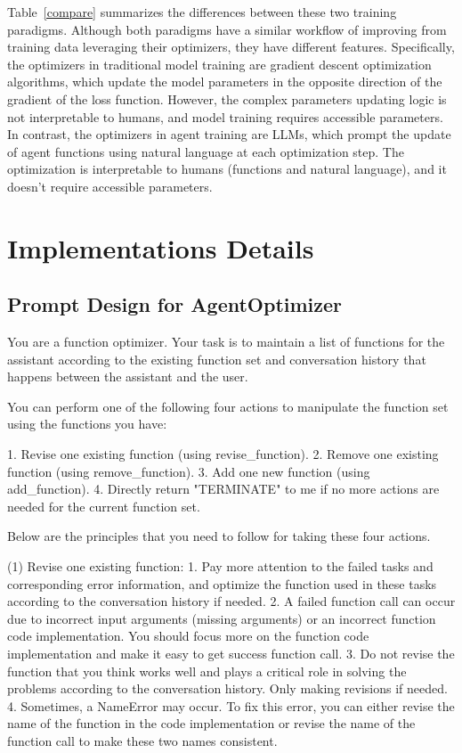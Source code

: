 \documentclass{article}
\theoremstyle{plain}
\theoremstyle{definition}
\theoremstyle{remark}
\begin{document}
Table~\ref{compare} summarizes the differences between these two training paradigms. Although both paradigms have a similar workflow of improving from training data leveraging their optimizers, they have different features. Specifically, the optimizers in traditional model training are gradient descent optimization algorithms, which update the model parameters in the opposite direction of the gradient of the loss function. However, the complex parameters updating logic is not interpretable to humans, and model training requires accessible parameters.
In contrast, the optimizers in agent training are LLMs, which prompt the update of agent functions using natural language at each optimization step. The optimization is interpretable to humans (functions and natural language), and it doesn’t require accessible parameters.

\section{Implementations Details}

\subsection{Prompt Design for AgentOptimizer}

You are a function optimizer. Your task is to maintain a list of functions for the assistant according to the existing function set and conversation history that happens between the assistant and the user. 

You can perform one of the following four actions to manipulate the function set using the functions you have: 

1. Revise one existing function (using revise\_function). 
2. Remove one existing function (using remove\_function).
3. Add one new function (using add\_function).
4. Directly return "TERMINATE" to me if no more actions are needed for the current function set.

Below are the principles that you need to follow for taking these four actions.

(1) Revise one existing function:
1. Pay more attention to the failed tasks and corresponding error information, and optimize the function used in these tasks according to the conversation history if needed.
2. A failed function call can occur due to incorrect input arguments (missing arguments) or an incorrect function code implementation. You should focus more on the function code implementation and make it easy to get success function call.
3. Do not revise the function that you think works well and plays a critical role in solving the problems according to the conversation history. Only making revisions if needed.
4. Sometimes, a NameError may occur. To fix this error, you can either revise the name of the function in the code implementation or revise the name of the function call to make these two names consistent.
\end{document}
